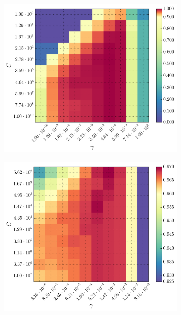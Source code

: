 \begin{figure}[h]
	\centering
	\begin{subfigure}[t]{0.49\textwidth}
		\centering
		\includegraphics[width=\textwidth]{figures/gridsearch/svm/superclasses/svm-superclasses-01.png}				
	\end{subfigure}
	\begin{subfigure}[t]{0.49\textwidth}
		\centering
		\includegraphics[width=\textwidth]{figures/gridsearch/svm/superclasses/svm-superclasses-02.png}		

\end{subfigure}
\end{figure}
